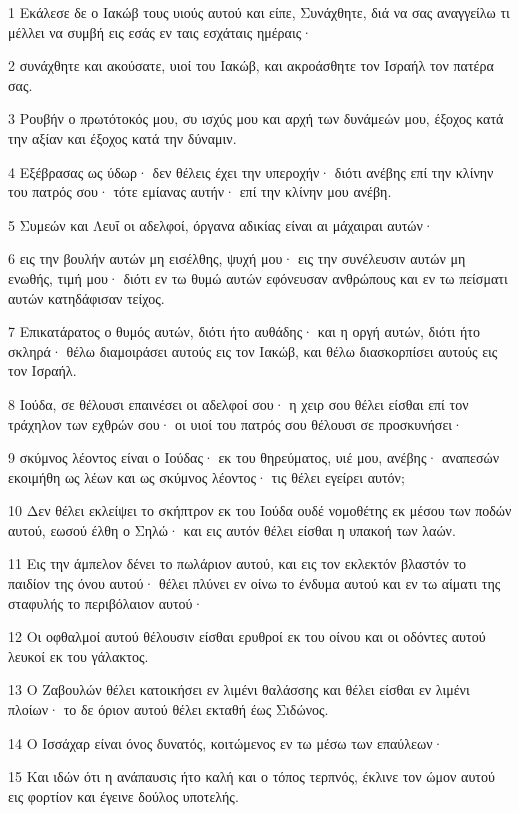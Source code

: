 \par 1 Εκάλεσε δε ο Ιακώβ τους υιούς αυτού και είπε, Συνάχθητε, διά να σας αναγγείλω τι μέλλει να συμβή εις εσάς εν ταις εσχάταις ημέραις·
\par 2 συνάχθητε και ακούσατε, υιοί του Ιακώβ, και ακροάσθητε τον Ισραήλ τον πατέρα σας.
\par 3 Ρουβήν ο πρωτότοκός μου, συ ισχύς μου και αρχή των δυνάμεών μου, έξοχος κατά την αξίαν και έξοχος κατά την δύναμιν.
\par 4 Εξέβρασας ως ύδωρ· δεν θέλεις έχει την υπεροχήν· διότι ανέβης επί την κλίνην του πατρός σου· τότε εμίανας αυτήν· επί την κλίνην μου ανέβη.
\par 5 Συμεών και Λευΐ οι αδελφοί, όργανα αδικίας είναι αι μάχαιραι αυτών·
\par 6 εις την βουλήν αυτών μη εισέλθης, ψυχή μου· εις την συνέλευσιν αυτών μη ενωθής, τιμή μου· διότι εν τω θυμώ αυτών εφόνευσαν ανθρώπους και εν τω πείσματι αυτών κατηδάφισαν τείχος.
\par 7 Επικατάρατος ο θυμός αυτών, διότι ήτο αυθάδης· και η οργή αυτών, διότι ήτο σκληρά· θέλω διαμοιράσει αυτούς εις τον Ιακώβ, και θέλω διασκορπίσει αυτούς εις τον Ισραήλ.
\par 8 Ιούδα, σε θέλουσι επαινέσει οι αδελφοί σου· η χειρ σου θέλει είσθαι επί τον τράχηλον των εχθρών σου· οι υιοί του πατρός σου θέλουσι σε προσκυνήσει·
\par 9 σκύμνος λέοντος είναι ο Ιούδας· εκ του θηρεύματος, υιέ μου, ανέβης· αναπεσών εκοιμήθη ως λέων και ως σκύμνος λέοντος· τις θέλει εγείρει αυτόν;
\par 10 Δεν θέλει εκλείψει το σκήπτρον εκ του Ιούδα ουδέ νομοθέτης εκ μέσου των ποδών αυτού, εωσού έλθη ο Σηλώ· και εις αυτόν θέλει είσθαι η υπακοή των λαών.
\par 11 Εις την άμπελον δένει το πωλάριον αυτού, και εις τον εκλεκτόν βλαστόν το παιδίον της όνου αυτού· θέλει πλύνει εν οίνω το ένδυμα αυτού και εν τω αίματι της σταφυλής το περιβόλαιον αυτού·
\par 12 Οι οφθαλμοί αυτού θέλουσιν είσθαι ερυθροί εκ του οίνου και οι οδόντες αυτού λευκοί εκ του γάλακτος.
\par 13 Ο Ζαβουλών θέλει κατοικήσει εν λιμένι θαλάσσης και θέλει είσθαι εν λιμένι πλοίων· το δε όριον αυτού θέλει εκταθή έως Σιδώνος.
\par 14 Ο Ισσάχαρ είναι όνος δυνατός, κοιτώμενος εν τω μέσω των επαύλεων·
\par 15 Και ιδών ότι η ανάπαυσις ήτο καλή και ο τόπος τερπνός, έκλινε τον ώμον αυτού εις φορτίον και έγεινε δούλος υποτελής.

